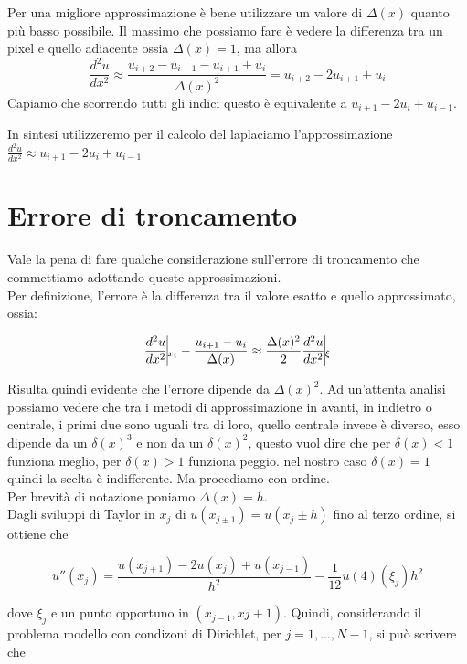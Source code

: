 \raggedright
Per una migliore approssimazione è bene utilizzare un valore di $\Delta(x)$ quanto più basso possibile. Il massimo che possiamo fare è vedere la differenza tra un pixel e quello adiacente ossia $\Delta(x)=1$, ma allora 
$$\frac{d^2u}{dx^2} \approx
\frac{
 u_{i+2} - u_{i+1} 
-u_{i+1} + u_i}
{\Delta(x)^2} = u_{i+2} -2 u_{i+1} + u_i$$
Capiamo che scorrendo tutti gli indici questo è equivalente a $u_{i+1} -2 u_i + u_{i-1}.$

In sintesi utilizzeremo per il calcolo del laplaciamo l'approssimazione \\
\vspace{2pt}
\centering 
$\frac{d^2u}{dx^2} \approx u_{i+1} -2 u_i + u_{i-1}$\\
\vspace{2pt}
\raggedright

\section{Errore di troncamento}

Vale la pena di fare qualche considerazione sull'errore di troncamento che commettiamo adottando queste approssimazioni.\\
Per definizione, l'errore è la differenza tra il valore esatto e quello approssimato, ossia: 

$$
\frac{d^2u}{dx^2}\vline_{x_i}-\frac{u_{i+1}-u_i}{\Delta(x)}\approx \frac{\Delta(x)^2}{2} \frac{d^2u}{dx^2}\vline_\xi
$$

Risulta quindi evidente che l'errore dipende da $\Delta(x)^2$. 
Ad un'attenta analisi possiamo vedere che tra i metodi di approssimazione in avanti, in indietro o centrale, i primi due sono uguali tra di loro, quello centrale invece è diverso, esso dipende da un $\delta(x)^3$ e non da un $\delta(x)^2$, questo vuol dire che per $\delta(x)<1$ funziona meglio, per $\delta(x)>1$ funziona peggio. nel nostro caso $\delta(x)=1$ quindi la scelta è indifferente.
Ma procediamo con ordine.\\

Per brevità di notazione poniamo $\Delta(x)=h$.\\
Dagli sviluppi di Taylor in $x_j$ di
$u(x_{j \pm 1}) = u(x_j \pm h)$ fino al terzo ordine, si ottiene che

$$
u''(x_j) =\frac{u(x_{j+1}) - 2u(x_j) + u(x_{j-1})}{h^2} -\frac{1}{12} u(4)(\xi_j)h^2
$$

dove $\xi_j$ e un punto opportuno in $(x_{j-1} , x{j+1})$. Quindi, considerando il problema modello con condizoni di Dirichlet, per $j = 1,...,N-1$, si può scrivere che

